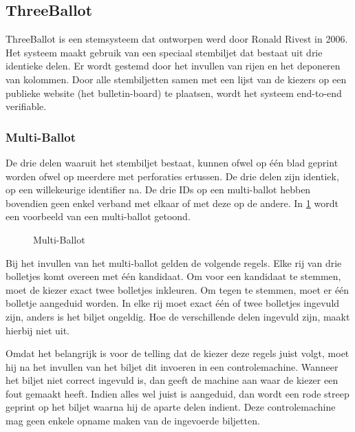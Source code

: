\subsection{ThreeBallot~\cite{rivest_threeballot}}
\label{sec:ls:threeballot}

ThreeBallot is een stemsysteem dat ontworpen werd door Ronald Rivest in 2006. Het systeem maakt gebruik van een speciaal stembiljet dat bestaat uit drie identieke delen. Er wordt gestemd door het invullen van rijen en het deponeren van kolommen. Door alle stembiljetten samen met een lijst van de kiezers op een publieke website (het bulletin-board) te plaatsen, wordt het systeem end-to-end verifiable.

\subsubsection{Multi-Ballot}
\label{sec:ls:multi-ballot}

De drie delen waaruit het stembiljet bestaat, kunnen ofwel op één blad geprint worden ofwel op meerdere met perforaties ertussen. De drie delen zijn identiek, op een willekeurige identifier na. De drie IDs op een multi-ballot hebben bovendien geen enkel verband met elkaar of met deze op de andere. In \ref{fig:ls:threeballot} wordt een voorbeeld van een multi-ballot getoond.

\begin{figure}
  \caption{Multi-Ballot\cite{rivest_threeballot}}
  \label{fig:ls:threeballot}
\end{figure}

\npar Bij het invullen van het multi-ballot gelden de volgende regels. Elke rij van drie bolletjes komt overeen met \'e\'en kandidaat. Om voor een kandidaat te stemmen, moet de kiezer exact twee bolletjes inkleuren. Om tegen te stemmen, moet er \'e\'en bolletje aangeduid worden. In elke rij moet exact \'e\'en of twee bolletjes ingevuld zijn, anders is het biljet ongeldig. Hoe de verschillende delen ingevuld zijn, maakt hierbij niet uit.

\npar Omdat het belangrijk is voor de telling dat de kiezer deze regels juist volgt, moet hij na het invullen van het biljet dit invoeren in een controlemachine. Wanneer het biljet niet correct ingevuld is, dan geeft de machine aan waar de kiezer een fout gemaakt heeft. Indien alles wel juist is aangeduid, dan wordt een rode streep geprint op het biljet waarna hij de aparte delen indient. Deze controlemachine mag geen enkele opname maken van de ingevoerde biljetten.


